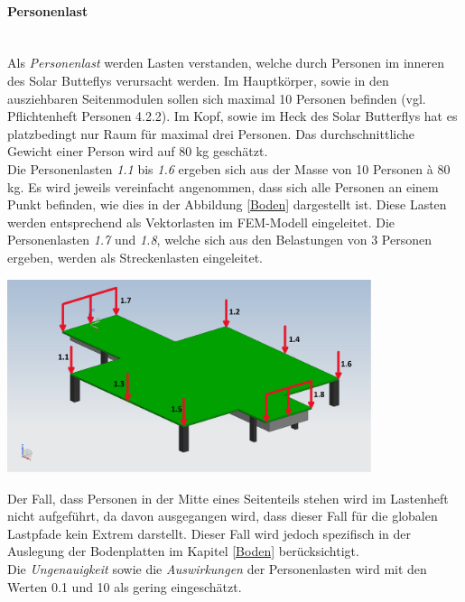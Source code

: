 \paragraph{Personenlast}\mbox{}\\
Als \emph{Personenlast} werden Lasten verstanden, welche durch Personen im inneren des Solar Butteflys verursacht werden. Im Hauptkörper, sowie in den ausziehbaren Seitenmodulen sollen sich maximal 10 Personen befinden (vgl. Pflichtenheft Personen 4.2.2). Im Kopf, sowie im Heck des Solar Butterflys hat es platzbedingt nur Raum für maximal drei Personen. Das durchschnittliche Gewicht einer Person wird auf 80 kg geschätzt.\\
Die Personenlasten \emph{1.1} bis \emph{1.6} ergeben sich aus der Masse von 10 Personen à 80 kg. Es wird jeweils vereinfacht angenommen, dass sich alle Personen an einem Punkt befinden, wie dies in der Abbildung \ref{Boden} dargestellt ist. Diese Lasten werden entsprechend als Vektorlasten im FEM-Modell eingeleitet. Die Personenlasten \emph{1.7} und \emph{1.8}, welche sich aus den Belastungen von 3 Personen ergeben, werden als Streckenlasten eingeleitet.

\begin{center}
  \includegraphics[width=0.8\textwidth]{04_Figures/BodenMitLasten.png}
  \label{Boden}
\end{center}

Der Fall, dass Personen in der Mitte eines Seitenteils stehen wird im Lastenheft nicht aufgeführt, da davon ausgegangen wird, dass dieser Fall für die globalen Lastpfade kein Extrem darstellt. Dieser Fall wird jedoch spezifisch in der Auslegung der Bodenplatten im Kapitel \ref{Boden} berücksichtigt.\\
Die \emph{Ungenauigkeit} sowie die \emph{Auswirkungen} der Personenlasten wird mit den Werten 0.1 und 10 als gering eingeschätzt.


